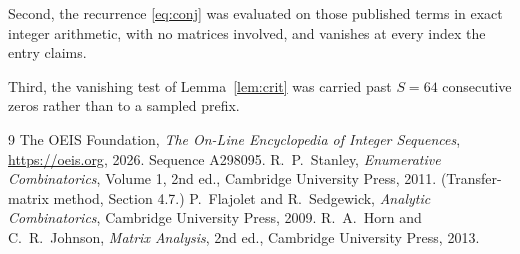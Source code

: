 \documentclass[11pt,a4paper]{article}
\theoremstyle{plain}
\theoremstyle{definition}
\begin{document}
Second, the recurrence \eqref{eq:conj} was evaluated on those published terms in exact
integer arithmetic, with no matrices involved, and vanishes at every index the entry claims.

Third, the vanishing test of Lemma~\ref{lem:crit} was carried past $S=64$ consecutive
zeros rather than to a sampled prefix.

\begin{thebibliography}{9}
 The OEIS Foundation, \emph{The On-Line Encyclopedia of Integer
Sequences}, \url{https://oeis.org}, 2026. Sequence A298095.
 R.~P.~Stanley, \emph{Enumerative Combinatorics}, Volume 1, 2nd ed.,
Cambridge University Press, 2011. (Transfer-matrix method, Section 4.7.)
 P.~Flajolet and R.~Sedgewick, \emph{Analytic Combinatorics}, Cambridge
University Press, 2009.
 R.~A.~Horn and C.~R.~Johnson, \emph{Matrix Analysis}, 2nd ed., Cambridge
University Press, 2013.
\end{thebibliography}
\end{document}
